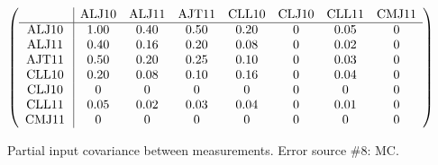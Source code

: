 \begin{table}[H]
\scriptsize
\begin{center}
\renewcommand{\arraystretch}{1.1}
\begin{math}\left(\begin{array}{c|ccccccc}
 & \mathrm{ALJ10} & 
\mathrm{ALJ11} & 
\mathrm{AJT11} & 
\mathrm{CLL10} & 
\mathrm{CLJ10} & 
\mathrm{CLL11} & 
\mathrm{CMJ11} \\
\hline
\mathrm{ALJ10} \hspace*{2pt} &       1.00 &       0.40 &       0.50 &       0.20 &  0 &       0.05 &  0 \\
\mathrm{ALJ11} \hspace*{2pt} &       0.40 &       0.16 &       0.20 &       0.08 &  0 &       0.02 &  0 \\
\mathrm{AJT11} \hspace*{2pt} &       0.50 &       0.20 &       0.25 &       0.10 &  0 &       0.03 &  0 \\
\mathrm{CLL10} \hspace*{2pt} &       0.20 &       0.08 &       0.10 &       0.16 &  0 &       0.04 &  0 \\
\mathrm{CLJ10} \hspace*{2pt} &  0 &  0 &  0 &  0 &  0 &  0 &  0 \\
\mathrm{CLL11} \hspace*{2pt} &       0.05 &       0.02 &       0.03 &       0.04 &  0 &       0.01 &  0 \\
\mathrm{CMJ11} \hspace*{2pt} &  0 &  0 &  0 &  0 &  0 &  0 &  0 \\
\end{array}\right)\end{math}
\caption{Partial input covariance between measurements. Error source \#8: MC.}
\renewcommand{\arraystretch}{1}
\end{center}
\end{table}
